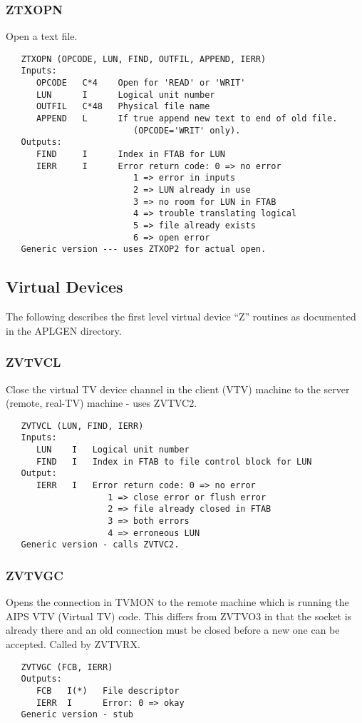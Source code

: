 \subsubsection{ZTXOPN}
Open a text file.
\begin{verbatim}
   ZTXOPN (OPCODE, LUN, FIND, OUTFIL, APPEND, IERR)
   Inputs:
      OPCODE   C*4    Open for 'READ' or 'WRIT'
      LUN      I      Logical unit number
      OUTFIL   C*48   Physical file name
      APPEND   L      If true append new text to end of old file.
                         (OPCODE='WRIT' only).
   Outputs:
      FIND     I      Index in FTAB for LUN
      IERR     I      Error return code: 0 => no error
                         1 => error in inputs
                         2 => LUN already in use
                         3 => no room for LUN in FTAB
                         4 => trouble translating logical
                         5 => file already exists
                         6 => open error
   Generic version --- uses ZTXOP2 for actual open.
\end{verbatim}

\subsection {Virtual Devices}

   The following describes the first level virtual device ``Z''
routines as documented in the APLGEN directory.

\subsubsection{ZVTVCL}
Close the virtual TV device channel in the client (VTV) machine to
the server (remote, real-TV) machine - uses ZVTVC2.
\begin{verbatim}
   ZVTVCL (LUN, FIND, IERR)
   Inputs:
      LUN    I   Logical unit number
      FIND   I   Index in FTAB to file control block for LUN
   Output:
      IERR   I   Error return code: 0 => no error
                    1 => close error or flush error
                    2 => file already closed in FTAB
                    3 => both errors
                    4 => erroneous LUN
   Generic version - calls ZVTVC2.
\end{verbatim}

\subsubsection{ZVTVGC}
Opens the connection in TVMON to the remote machine which is
running the AIPS VTV (Virtual TV) code.  This differs from ZVTVO3 in
that the socket is already there and an old connection must be
closed before a new one can be accepted.  Called by ZVTVRX.
\begin{verbatim}
   ZVTVGC (FCB, IERR)
   Outputs:
      FCB   I(*)   File descriptor
      IERR  I      Error: 0 => okay
   Generic version - stub
\end{verbatim}

